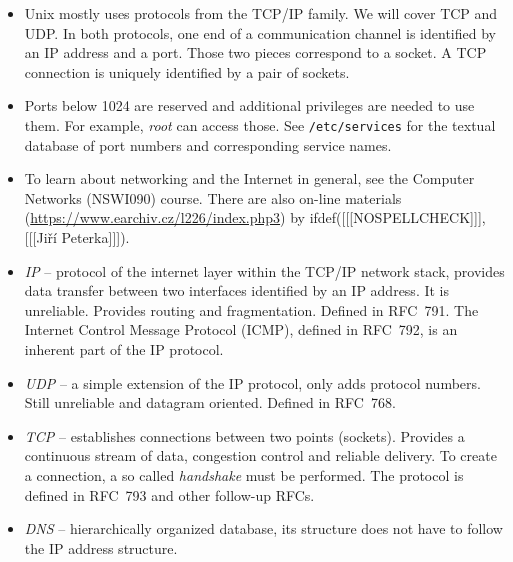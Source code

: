 \begin{itemize}
\item Unix mostly uses protocols from the TCP/IP family.  We will cover TCP and
UDP.  In both protocols, one end of a communication channel is identified by an
IP address and a port.  Those two pieces correspond to a socket.  A TCP
connection is uniquely identified by a pair of sockets.
\item Ports below 1024 are reserved and additional privileges are needed to use
them.  For example, \emph{root} can access those.  See \texttt{/etc/services}
for the textual database of port numbers and corresponding service names.
\item To learn about networking and the Internet in general,
see the Computer Networks (NSWI090) course.
There are also on-line materials (\url{https://www.earchiv.cz/l226/index.php3})
by ifdef([[[NOSPELLCHECK]]], [[[Ji\v{r}\'{i} Peterka]]]).
\item \emph{IP} -- protocol of the internet layer within the TCP/IP network
stack, provides data transfer between two interfaces identified by an IP
address.  It is unreliable.  Provides routing and fragmentation.  Defined in
RFC~791.  The Internet Control Message Protocol (ICMP), defined in RFC~792, is
an inherent part of the IP protocol.
\item \emph{UDP} -- a simple extension of the IP protocol, only adds protocol
numbers.  Still unreliable and datagram oriented.  Defined in RFC~768.
\item \emph{TCP} -- establishes connections between two points (sockets).
Provides a continuous stream of data, congestion control and reliable
delivery.  To create a connection, a so called \emph{handshake} must be
performed.  The protocol is defined in RFC~793 and other follow-up RFCs.
\item \emph{DNS} -- hierarchically organized database, its structure does not
have to follow the IP address structure.
\end{itemize}


\begin{slide}

\end{slide}

